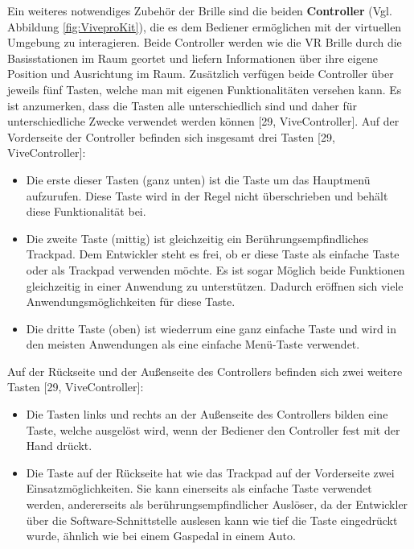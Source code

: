 \newline\newline
Ein weiteres notwendiges Zubehör der Brille sind die beiden \textbf{Controller} (Vgl. Abbildung \ref{fig:ViveproKit}), die es dem Bediener ermöglichen mit der virtuellen Umgebung zu interagieren. Beide Controller werden wie die VR Brille durch die Basisstationen im Raum geortet und liefern Informationen über ihre eigene Position und Ausrichtung im Raum. Zusätzlich verfügen beide Controller über jeweils fünf Tasten, welche man mit eigenen Funktionalitäten versehen kann. Es ist anzumerken, dass die Tasten alle unterschiedlich sind und daher für unterschiedliche Zwecke verwendet werden können [29, ViveController].
\newline
Auf der Vorderseite der Controller befinden sich insgesamt drei Tasten [29, ViveController]:
\begin{itemize}
	\item Die erste dieser Tasten (ganz unten) ist die Taste um das Hauptmenü aufzurufen. Diese 
	Taste wird in der Regel nicht überschrieben und behält diese Funktionalität bei.
	\item Die zweite Taste (mittig) ist gleichzeitig ein Berührungsempfindliches Trackpad. Dem 
	Entwickler steht es frei, ob er diese Taste als einfache Taste oder als Trackpad verwenden 
	möchte. Es ist sogar Möglich beide Funktionen gleichzeitig in einer Anwendung zu 
	unterstützen. Dadurch eröffnen sich viele Anwendungsmöglichkeiten für diese Taste.
	\item Die dritte Taste (oben) ist wiederrum eine ganz einfache Taste und wird in den meisten 
	Anwendungen als eine einfache Menü-Taste verwendet.
\end{itemize}
Auf der Rückseite und der Außenseite des Controllers befinden sich zwei weitere Tasten [29, ViveController]:
\begin{itemize}
	\item Die Tasten links und rechts an der Außenseite des Controllers bilden eine Taste, welche 
	ausgelöst wird, wenn der Bediener den Controller fest mit der Hand drückt.
	\item Die Taste auf der Rückseite hat wie das Trackpad auf der Vorderseite zwei 
	Einsatzmöglichkeiten. Sie kann einerseits als einfache Taste verwendet werden, andererseits 
	als berührungsempfindlicher Auslöser, da der Entwickler über die Software-Schnittstelle 
	auslesen kann wie tief die Taste eingedrückt wurde, ähnlich wie bei einem Gaspedal in
	einem Auto.
\end{itemize}
